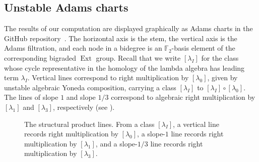 \documentclass[dvipsnames,table]{amsart}
\theoremstyle{definition}
\theoremstyle{remark}
\numberwithin{equation}{section}
\begin{document}
\subsection{Unstable Adams charts}
\label{app:charts}
\noindent The results of our computation are displayed graphically as Adams charts in the GitHub repository~\cite{ehpreprint_data}. The horizontal axis is the stem, the vertical axis is the Adams filtration, and each node in a bidegree is an $\mathbb{F}_2$-basis element of the corresponding bigraded $\operatorname{Ext}$ group. 
\medskip
\noindent Recall that we write $[\lambda_I]$ for the class whose cycle representative in the homology of the lambda algebra has leading term $\lambda_I$. Vertical lines correspond to right multiplication by $[\lambda_0]$, given by unstable algebraic Yoneda composition, carrying a class $[\lambda_I]$ to $[\lambda_I] \circ [\lambda_0]$. The lines of slope $1$ and slope $1/3$ correspond to algebraic right multiplication by $[\lambda_1]$ and $[\lambda_3]$, respectively (see ).

\begin{figure}[H]
\centering
{}
\caption{The structural product lines. From a class $[\lambda_I]$, a vertical line records right multiplication by $[\lambda_0]$, a slope-$1$ line records right multiplication by $[\lambda_1]$, and a slope-$1/3$ line records right multiplication by $[\lambda_3]$.}
\label{fig:chart-structure}
\end{figure}
\end{document}
